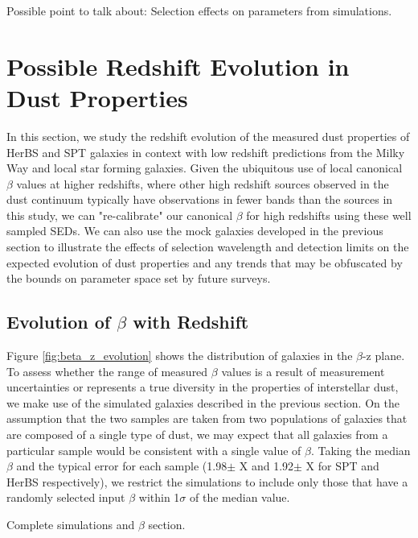 {\color{red} Possible point to talk about: Selection effects on parameters from simulations.}

\section{Possible Redshift Evolution in Dust Properties}
\label{sec:redshift_evolution}

In this section, we study the redshift evolution of the measured dust properties of HerBS and SPT galaxies in context with low redshift predictions from the Milky Way and local star forming galaxies. Given the ubiquitous use of local canonical $\beta$ values at higher redshifts, where other high redshift sources observed in the dust continuum typically have observations in fewer bands than the sources in this study, we can "re-calibrate" our canonical $\beta$ for high redshifts using these well sampled SEDs. We can also use the mock galaxies developed in the previous section to illustrate the effects of selection wavelength and detection limits on the expected evolution of dust properties and any trends that may be obfuscated by the bounds on parameter space set by future surveys. 

\subsection{Evolution of $\beta$ with Redshift}

Figure \ref{fig:beta_z_evolution} shows the distribution of galaxies in the $\beta$-z plane. To assess whether the range of measured $\beta$ values is a result of measurement uncertainties or represents a true diversity in the properties of interstellar dust, we make use of the simulated galaxies described in the previous section. On the assumption that the two samples are taken from two populations of galaxies that are composed of a single type of dust, we may expect that all galaxies from a particular sample would be consistent with a single value of $\beta$. Taking the median $\beta$ and the typical error for each sample (1.98$\pm${\color{red} X} and 1.92$\pm${\color{red} X} for SPT and HerBS respectively), we restrict the simulations to include only those that have a randomly selected input $\beta$ within 1$\sigma$ of the median value. 

{\color{red} Complete simulations and $\beta$ section.}

